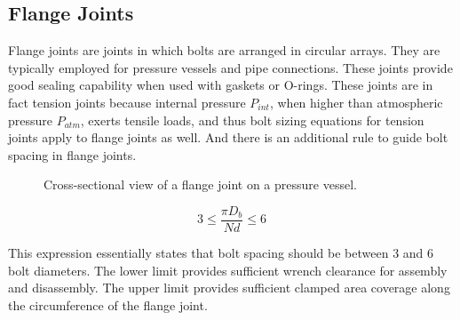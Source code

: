 \documentclass[
10pt,
a4paper,
openany,
svgnames,
]{book}
\begin{document}
\subsection{Flange Joints}

Flange joints are joints in which bolts are arranged in circular arrays. They are typically employed for pressure vessels and pipe connections. These joints provide good sealing capability when used with gaskets or O-rings. These joints are in fact tension joints because internal pressure $P_{int}$, when higher than atmospheric pressure $P_{atm}$, exerts tensile loads, and thus bolt sizing equations for tension joints apply to flange joints as well. And there is an additional rule to guide bolt spacing in flange joints. 

\begin{figure}[h]
  \centering
  \caption{Cross-sectional view of a flange joint on a pressure vessel.}
\end{figure}

\begin{equation}
  3 \leqslant \frac{\pi D_b}{Nd} \leqslant 6
\end{equation}

This expression essentially states that bolt spacing should be between 3 and 6 bolt diameters. The lower limit provides sufficient wrench clearance for assembly and disassembly. The upper limit provides sufficient clamped area coverage along the circumference of the flange joint.
\end{document}
